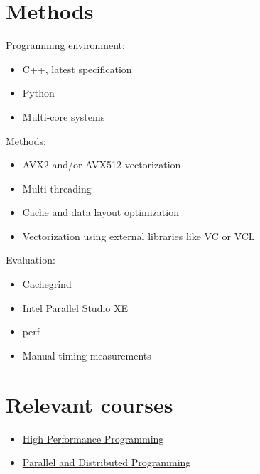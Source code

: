 \documentclass[12pt]{article}
\begin{document}
	\section{Methods}
	
	Programming environment:
	\begin{itemize}
		\item C++, latest specification
		\item Python
		\item Multi-core systems
	\end{itemize}

	Methods:
	\begin{itemize}
		\item AVX2 and/or AVX512 vectorization
		\item Multi-threading
		\item Cache and data layout optimization
		\item Vectorization using external libraries like VC or VCL
	\end{itemize}

	Evaluation:
	\begin{itemize}
		\item Cachegrind
		\item Intel Parallel Studio XE
		\item perf
		\item Manual timing measurements
	\end{itemize}



	\newpage
	\section{Relevant courses}
	
	\begin{itemize}
		\item \href{http://www.uu.se/en/admissions/master/selma/kursplan/?kpid=31897&lasar=18%2F19&typ=1}
			{High Performance Programming}	
		
		\item \href{http://www.uu.se/en/admissions/master/selma/kursplan/?kpid=31898&type=1}
			{Parallel and Distributed Programming}
	\end{itemize}
\end{document}

